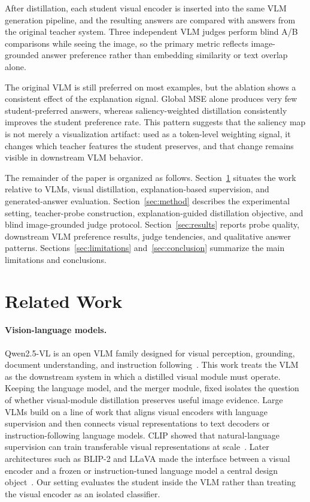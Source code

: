 After distillation, each student visual encoder is inserted into the same VLM generation pipeline, and the resulting answers are compared with answers from the original teacher system.
Three independent VLM judges perform blind A/B comparisons while seeing the image, so the primary metric reflects image-grounded answer preference rather than embedding similarity or text overlap alone.

The original VLM is still preferred on most examples, but the ablation shows a consistent effect of the explanation signal.
Global MSE alone produces very few student-preferred answers, whereas saliency-weighted distillation consistently improves the student preference rate.
This pattern suggests that the saliency map is not merely a visualization artifact: used as a token-level weighting signal, it changes which teacher features the student preserves, and that change remains visible in downstream VLM behavior.

The remainder of the paper is organized as follows.
Section~\ref{sec:related} situates the work relative to VLMs, visual distillation, explanation-based supervision, and generated-answer evaluation.
Section~\ref{sec:method} describes the experimental setting, teacher-probe construction, explanation-guided distillation objective, and blind image-grounded judge protocol.
Section~\ref{sec:results} reports probe quality, downstream VLM preference results, judge tendencies, and qualitative answer patterns.
Sections~\ref{sec:limitations} and~\ref{sec:conclusion} summarize the main limitations and conclusions.

\section{Related Work}
\label{sec:related}

\paragraph{Vision-language models.}
Qwen2.5-VL is an open VLM family designed for visual perception, grounding, document understanding, and instruction following~\citep{qwen2025vl}.
This work treats the VLM as the downstream system in which a distilled visual module must operate. Keeping the language model, and the merger module, fixed isolates the question of whether visual-module distillation preserves useful image evidence.
Large VLMs build on a line of work that aligns visual encoders with language supervision and then connects visual representations to text decoders or instruction-following language models.
CLIP showed that natural-language supervision can train transferable visual representations at scale~\citep{radford2021clip}.
Later architectures such as BLIP-2 and LLaVA made the interface between a visual encoder and a frozen or instruction-tuned language model a central design object~\citep{li2023blip2,liu2023llava}.
Our setting evaluates the student inside the VLM rather than treating the visual encoder as an isolated classifier.

